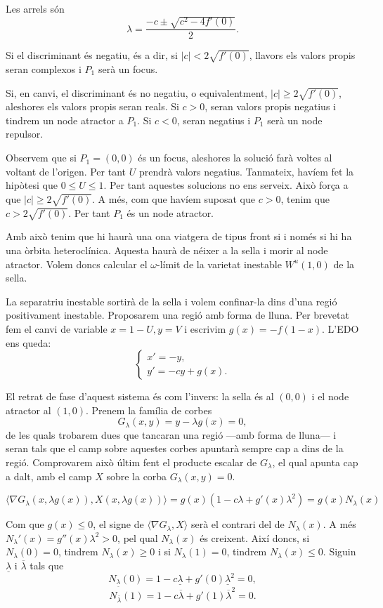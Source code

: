 \documentclass{article}
\theoremstyle{definition}
\begin{document}
Les arrels s\'{o}n
\[\lambda=\frac{-c\pm\sqrt{c^2-4f'(0)}}{2}.\]

Si el discriminant \'{e}s negatiu, \'{e}s a dir, si $|c|<2\sqrt{f'(0)}$, llavors els valors propis seran complexos i $P_1$ ser\`{a} un focus.

Si, en canvi, el discriminant \'{e}s no negatiu, o equivalentment, $|c|\geq2\sqrt{f'(0)}$, aleshores els valors propis seran reals. Si $c>0$, seran  valors propis negatius i tindrem un node atractor a $P_1$. Si $c<0$, seran negatius i $P_1$ ser\`{a} un node repulsor.

Observem que si $P_1=(0,0)$ \'{e}s un focus, aleshores la soluci\'{o} far\`{a} voltes al voltant de l'origen. Per tant $U$ prendr\`{a} valors negatius. Tanmateix, hav\'{i}em fet la hip\`{o}tesi que $0\leq U\leq1$. Per tant aquestes solucions no ens serveix. Aix\`{o} for\c{c}a a que $|c|\geq2\sqrt{f'(0)}$. A m\'{e}s, com que hav\'{i}em suposat que $c>0$, tenim que $c>2\sqrt{f'(0)}$. Per tant $P_1$ \'{e}s un node atractor.

Amb aix\`{o} tenim que hi haur\`{a} una ona viatgera de tipus front si i nom\'{e}s si hi ha una \`{o}rbita heterocl\'{i}nica. Aquesta haur\`{a} de n\'{e}ixer a la sella i morir al node atractor. Volem doncs calcular el $\omega$-l\'{i}mit de la varietat inestable $W^u(1,0)$ de la sella.

La separatriu inestable sortir\`{a} de la sella i volem confinar-la dins d'una regi\'{o} positivament inestable. Proposarem una regi\'{o} amb forma de lluna. Per brevetat fem el canvi de variable $x=1-U,y=V$ i escrivim $g(x)=-f(1-x)$. L'EDO ens queda:
\[\left\{\begin{array}{l}x'=-y,\\y'=-cy+g(x).\end{array}\right.\]

El retrat de fase d'aquest sistema \'{e}s com l'invers: la sella \'{e}s al $(0,0)$ i el node atractor al $(1,0)$. Prenem la fam\'{i}lia de corbes
\[G_{\lambda}(x,y)=y-\lambda g(x)=0,\]
de les quals trobarem dues que tancaran una regi\'{o} ---amb forma de lluna--- i seran tals que el camp sobre aquestes corbes apuntar\`{a} sempre cap a dins de la regi\'{o}. Comprovarem aix\`{o} \'{u}ltim fent el producte escalar de $G_{\lambda}$, el qual apunta cap a dalt, amb el camp $X$ sobre la corba $G_{\lambda}(x,y)=0$.

\[\langle\nabla G_{\lambda}(x,\lambda g(x)),X(x,\lambda g(x))\rangle=g(x)(1-c\lambda+g'(x)\lambda^2)=g(x)N_{\lambda}(x)\]

Com que $g(x)\leq0$, el signe de $\langle\nabla G_{\lambda},X\rangle$ ser\`{a} el contrari del de $N_{\lambda}(x)$. A m\'{e}s $N_{\lambda}'(x)=g''(x)\lambda^2>0$, pel qual $N_{\lambda}(x)$ \'{e}s creixent. Aix\'{i} doncs, si $N_{\lambda}(0)=0$, tindrem $N_{\lambda}(x)\geq0$ i si $N_{\lambda}(1)=0$, tindrem $N_{\lambda}(x)\leq0$. Siguin $\underline\lambda$ i $\overline\lambda$ tals que
\[N_{\underline\lambda}(0)=1-c\underline\lambda+g'(0)\underline\lambda^2=0,\]
\[N_{\overline\lambda}(1)=1-c\overline\lambda+g'(1)\overline\lambda^2=0.\]
\end{document}
